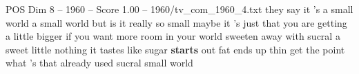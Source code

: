 \begin{textsample}{POS Dim 8 – 1960 – Score 1.00 – 1960/tv\_com\_1960\_4.txt}  \label{ex:f8_pos_067}
they say it 's a small world a small world but is it really so small maybe it 's just that you are getting a little bigger if you want more room in your world sweeten away with sucral a sweet little nothing it tastes like sugar \textbf{starts} out fat ends up thin get the point what 's that already used sucral small world

\end{textsample}
